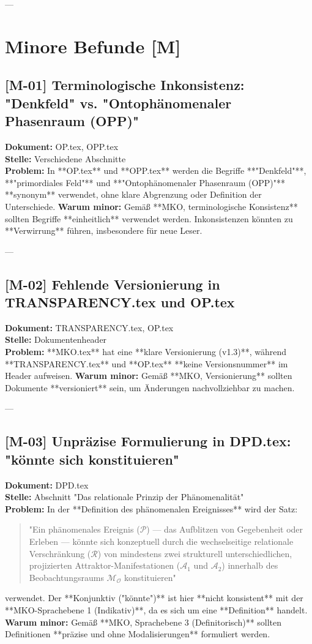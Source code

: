 \documentclass[11pt,a4paper]{article}
\begin{document}
---
\section*{Minore Befunde [M]}

\subsection*{[M-01] Terminologische Inkonsistenz: "Denkfeld" vs. "Ontophänomenaler Phasenraum (OPP)"}
\textbf{Dokument:} OP.tex, OPP.tex \\
\textbf{Stelle:} Verschiedene Abschnitte \\
\textbf{Problem:}
In **OP.tex** und **OPP.tex** werden die Begriffe **"Denkfeld"**, **"primordiales Feld"** und **"Ontophänomenaler Phasenraum (OPP)"** **synonym** verwendet, ohne klare Abgrenzung oder Definition der Unterschiede.
\textbf{Warum minor:}
Gemäß **MKO, terminologische Konsistenz** sollten Begriffe **einheitlich** verwendet werden. Inkonsistenzen könnten zu **Verwirrung** führen, insbesondere für neue Leser.

---

\subsection*{[M-02] Fehlende Versionierung in TRANSPARENCY.tex und OP.tex}
\textbf{Dokument:} TRANSPARENCY.tex, OP.tex \\
\textbf{Stelle:} Dokumentenheader \\
\textbf{Problem:}
**MKO.tex** hat eine **klare Versionierung (v1.3)**, während **TRANSPARENCY.tex** und **OP.tex** **keine Versionsnummer** im Header aufweisen.
\textbf{Warum minor:}
Gemäß **MKO, Versionierung** sollten Dokumente **versioniert** sein, um Änderungen nachvollziehbar zu machen.

---
\subsection*{[M-03] Unpräzise Formulierung in DPD.tex: "könnte sich konstituieren"}
\textbf{Dokument:} DPD.tex \\
\textbf{Stelle:} Abschnitt "Das relationale Prinzip der Phänomenalität" \\
\textbf{Problem:}
In der **Definition des phänomenalen Ereignisses** wird der Satz:
\begin{quote}
"Ein phänomenales Ereignis ($\mathcal{P}$) --- das Aufblitzen von Gegebenheit oder Erleben --- könnte sich konzeptuell durch die wechselseitige relationale Verschränkung ($\mathcal{R}$) von mindestens zwei strukturell unterschiedlichen, projizierten Attraktor-Manifestationen ($\mathcal{A}_1$ und $\mathcal{A}_2$) innerhalb des Beobachtungsraums $\mathcal{M}_{\mathcal{O}}$ konstituieren"
\end{quote}
verwendet. Der **Konjunktiv ("könnte")** ist hier **nicht konsistent** mit der **MKO-Sprachebene 1 (Indikativ)**, da es sich um eine **Definition** handelt.
\textbf{Warum minor:}
Gemäß **MKO, Sprachebene 3 (Definitorisch)** sollten Definitionen **präzise und ohne Modalisierungen** formuliert werden.
\end{document}
